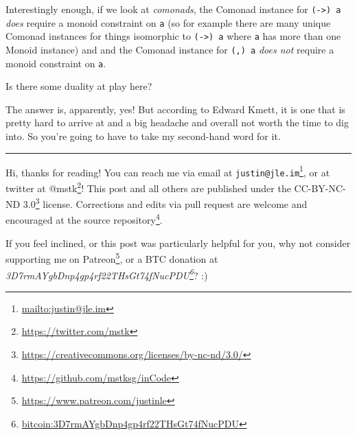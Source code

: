\documentclass[]{article}
\renewcommand{\href}[2]{#2\footnote{\url{#1}}}
\begin{document}
Interestingly enough, if we look at \emph{comonads}, the Comonad instance for
\texttt{(-\textgreater{})\ a} \emph{does} require a monoid constraint on
\texttt{a} (so for example there are many unique Comonad instances for things
isomorphic to \texttt{(-\textgreater{})\ a} where \texttt{a} has more than one
Monoid instance) and and the Comonad instance for \texttt{(,)\ a} \emph{does
not} require a monoid constraint on \texttt{a}.

Is there some duality at play here?

The answer is, apparently, yes! But according to Edward Kmett, it is one that is
pretty hard to arrive at and a big headache and overall not worth the time to
dig into. So you're going to have to take my second-hand word for it.

\begin{center}\rule{0.5\linewidth}{\linethickness}\end{center}

Hi, thanks for reading! You can reach me via email at
\href{mailto:justin@jle.im}{\nolinkurl{justin@jle.im}}, or at twitter at
\href{https://twitter.com/mstk}{@mstk}! This post and all others are published
under the \href{https://creativecommons.org/licenses/by-nc-nd/3.0/}{CC-BY-NC-ND
3.0} license. Corrections and edits via pull request are welcome and encouraged
at \href{https://github.com/mstksg/inCode}{the source repository}.

If you feel inclined, or this post was particularly helpful for you, why not
consider \href{https://www.patreon.com/justinle}{supporting me on Patreon}, or a
BTC donation at
\emph{\href{bitcoin:3D7rmAYgbDnp4gp4rf22THsGt74fNucPDU}{3D7rmAYgbDnp4gp4rf22THsGt74fNucPDU}}?
:)
\end{document}
